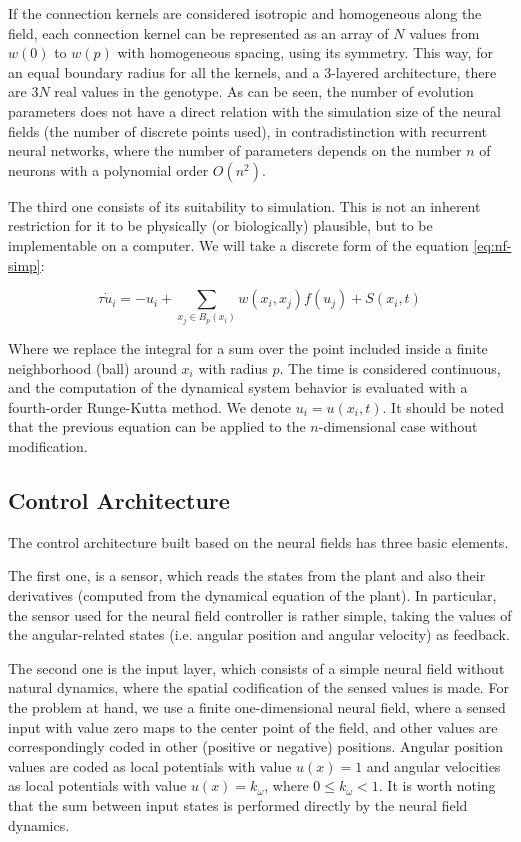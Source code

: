 \documentclass{sig-alternate}
\begin{document}
If the connection kernels are considered isotropic and homogeneous
along the field, each connection kernel can be represented as an array
of $N$ values from $w(0)$ to $w(p)$ with homogeneous spacing, using
its symmetry. This way, for an equal boundary radius for all the
kernels, and a 3-layered architecture, there are $3N$ real values in
the genotype. As can be seen, the number of evolution parameters does
not have a direct relation with the simulation size of the neural
fields (the number of discrete points used), in contradistinction with
recurrent neural networks, where the number of parameters depends on
the number $n$ of neurons with a polynomial order $O(n^2)$.


The third one consists of its suitability to simulation. This is not
an inherent restriction for it to be physically (or biologically)
plausible, but to be implementable on a computer. We will take a
discrete form of the equation \ref{eq:nf-simp}:


\begin{equation}
  \label{eq:nf-disc}
  \tau \dot{u}_i=-u_i+\sum_{x_j \in B_p(x_i)} {w\left(x_i,x_j\right)
    f\left( u_j \right)}+S(x_i,t)
\end{equation}

Where we replace the integral for a sum over the point included inside
a finite neighborhood (ball) around $x_i$ with radius $p$. The time is
considered continuous, and the computation of the dynamical system
behavior is evaluated with a fourth-order Runge-Kutta method. We
denote $u_i=u(x_i,t)$. It should be noted that the previous equation
can be applied to the $n$-dimensional case without modification.

\subsection*{Control Architecture} 
The control architecture built based on the neural fields has three
basic elements.

The first one, is a sensor, which reads the states from the plant and
also their derivatives (computed from the dynamical equation of the
plant). In particular, the sensor used for the neural field controller
is rather simple, taking the values of the angular-related states
(i.e. angular position and angular velocity) as feedback.

The second one is the input layer, which consists of a simple neural
field without natural dynamics, where the spatial codification of the
sensed values is made. For the problem at hand, we use a finite
one-dimensional neural field, where a sensed input with value zero
maps to the center point of the field, and other values are
correspondingly coded in other (positive or negative)
positions. Angular position values are coded as local potentials with
value $u(x)=1$ and angular velocities as local potentials with value
$u(x)=k_\omega$, where $0 \le k_\omega < 1$. It is worth noting that
the sum between input states is performed directly by the neural field
dynamics.
\end{document}
